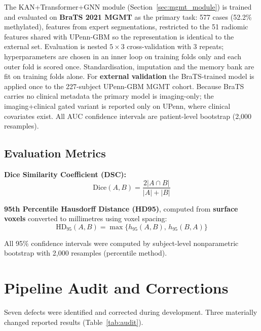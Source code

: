 \documentclass[conference]{IEEEtran}
\begin{document}
The KAN+Transformer+GNN module (Section~\ref{sec:mgmt_module}) is trained and evaluated on \textbf{BraTS 2021 MGMT} as the primary task: 577 cases (52.2\% methylated), features from expert segmentations, restricted to the 51 radiomic features shared with UPenn-GBM so the representation is identical to the external set. Evaluation is nested $5\times3$ cross-validation with 3 repeats; hyperparameters are chosen in an inner loop on training folds only and each outer fold is scored once. Standardisation, imputation and the memory bank are fit on training folds alone. For \textbf{external validation} the BraTS-trained model is applied once to the 227-subject UPenn-GBM MGMT cohort. Because BraTS carries no clinical metadata the primary model is imaging-only; the imaging+clinical gated variant is reported only on UPenn, where clinical covariates exist. All AUC confidence intervals are patient-level bootstrap (2{,}000 resamples).

\subsection{Evaluation Metrics}

\textbf{Dice Similarity Coefficient (DSC):}
\begin{equation}
\text{Dice}(A,B) = \frac{2|A\cap B|}{|A|+|B|}
\end{equation}

\textbf{95th Percentile Hausdorff Distance (HD95)}, computed from \textbf{surface voxels} converted to millimetres using voxel spacing:
\begin{equation}
\text{HD}_{95}(A,B) = \max\{h_{95}(A,B),\,h_{95}(B,A)\}
\end{equation}

All 95\% confidence intervals were computed by subject-level nonparametric bootstrap with 2,000 resamples (percentile method).

\section{Pipeline Audit and Corrections}
\label{sec:audit}

Seven defects were identified and corrected during development. Three materially changed reported results (Table~\ref{tab:audit}).
\end{document}
